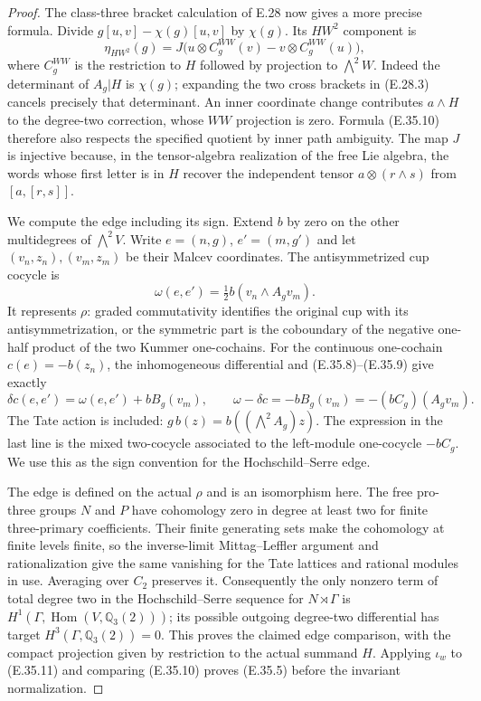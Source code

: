 \documentclass[11pt,oneside]{article}
\begin{document}
\begin{proof}
The class-three bracket calculation of E.28 now
gives a more precise formula. Divide
$g[u,v]-\chi(g)[u,v]$ by $\chi(g)$. Its
$HW^2$ component is
\[
 \eta_{HW^2}(g)=
 J\bigl(u\otimes C_g^{WW}(v)
            -v\otimes C_g^{WW}(u)\bigr),
 \tag{E.35.10}
\]
where $C_g^{WW}$ is the restriction to $H$
followed by projection to $\bigwedge^2W$.
Indeed the determinant of $A_g|H$ is $\chi(g)$;
expanding the two cross brackets in (E.28.3)
cancels precisely that determinant. An inner
coordinate change contributes $a\wedge H$
to the degree-two correction, whose $WW$
projection is zero. Formula (E.35.10) therefore
also respects the specified quotient by inner
path ambiguity. The map $J$ is injective because,
in the tensor-algebra realization of the free
Lie algebra, the words whose first letter is
in $H$ recover the independent tensor
$a\otimes(r\wedge s)$ from $[a,[r,s]]$.

We compute the edge including its sign. Extend
$b$ by zero on the other multidegrees of
$\bigwedge^2V$. Write $e=(n,g)$, $e'=(m,g')$
and let $(v_n,z_n),(v_m,z_m)$ be their Malcev
coordinates. The antisymmetrized cup cocycle is
\[
 \omega(e,e')=
       \tfrac12 b(v_n\wedge A_gv_m).
\]
It represents $\rho$: graded commutativity
identifies the original cup with its
antisymmetrization, or the symmetric part is
the coboundary of the negative one-half product
of the two Kummer one-cochains. For the
continuous one-cochain $c(e)=-b(z_n)$, the
inhomogeneous differential and (E.35.8)--(E.35.9)
give exactly
\[
 \delta c(e,e')
    =\omega(e,e')+bB_g(v_m),
 \qquad
 \omega-\delta c=-bB_g(v_m)
                         =-(bC_g)(A_gv_m).
 \tag{E.35.11}
\]
The Tate action is included: $g\,b(z)=
b((\bigwedge^2A_g)z)$. The expression in the
last line is the mixed two-cocycle associated
to the left-module one-cocycle $-bC_g$.
We use this as the sign convention for the
Hochschild--Serre edge.

The edge is defined on the actual $\rho$ and
is an isomorphism here. The free pro-three
groups $N$ and $P$ have cohomology zero in
degree at least two for finite three-primary
coefficients. Their finite generating sets
make the cohomology at finite levels finite,
so the inverse-limit Mittag--Leffler argument
and rationalization give the same vanishing
for the Tate lattices and rational modules in
use. Averaging over $C_2$ preserves it.
Consequently the only nonzero term of total
degree two in the Hochschild--Serre sequence
for $N\rtimes\Gamma$ is
$H^1(\Gamma,\operatorname{Hom}(V,\mathbb Q_3(2)))$;
its possible outgoing degree-two differential
has target $H^3(\Gamma,\mathbb Q_3(2))=0$.
This proves the claimed edge comparison, with
the compact projection given by restriction
to the actual summand $H$. Applying $\iota_w$
to (E.35.11) and comparing (E.35.10) proves
(E.35.5) before the invariant normalization.


\end{proof}
\end{document}
